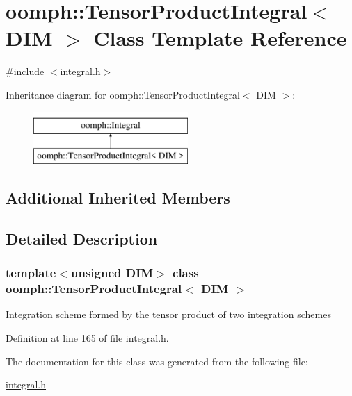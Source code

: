 \hypertarget{classoomph_1_1TensorProductIntegral}{}\section{oomph\+:\+:Tensor\+Product\+Integral$<$ D\+IM $>$ Class Template Reference}
\label{classoomph_1_1TensorProductIntegral}


{\ttfamily \#include $<$integral.\+h$>$}

Inheritance diagram for oomph\+:\+:Tensor\+Product\+Integral$<$ D\+IM $>$\+:\begin{figure}[H]
\begin{center}
\leavevmode
\includegraphics[height=2.000000cm]{classoomph_1_1TensorProductIntegral}
\end{center}
\end{figure}
\subsection*{Additional Inherited Members}


\subsection{Detailed Description}
\subsubsection*{template$<$unsigned D\+IM$>$\newline
class oomph\+::\+Tensor\+Product\+Integral$<$ D\+I\+M $>$}

Integration scheme formed by the tensor product of two integration schemes 

Definition at line 165 of file integral.\+h.



The documentation for this class was generated from the following file\+:\begin{DoxyCompactItemize}
\item 
\hyperlink{integral_8h}{integral.\+h}\end{DoxyCompactItemize}
